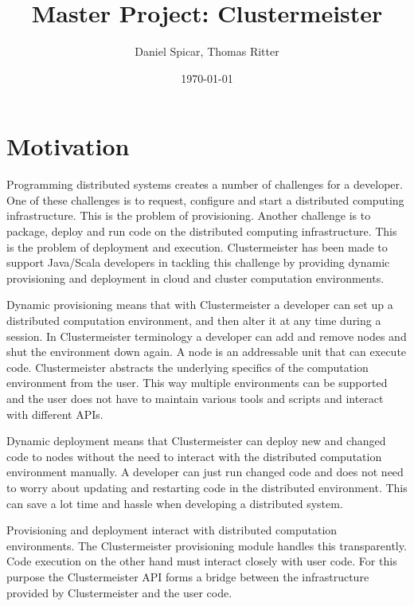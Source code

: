 \documentclass[english]{uzhpub}
\begin{document}
\title{Master Project: Clustermeister}


\author{Daniel Spicar, Thomas Ritter}

\date{\today}

\maketitle


\section{Motivation}

Programming distributed systems creates a number of challenges for a developer. One of these challenges is to request, configure and start a distributed computing infrastructure. This is the problem of provisioning. Another challenge is to package, deploy and run code on the distributed computing infrastructure. This is the problem of deployment and execution. Clustermeister has been made to support Java/Scala developers in tackling this challenge by providing dynamic provisioning and deployment in cloud and cluster computation environments.

Dynamic provisioning means that with Clustermeister a developer can set up a distributed computation environment, and then alter it at any time during a session. In Clustermeister terminology a developer can add and remove nodes and shut the environment down again. A node is an addressable unit that can execute code. Clustermeister abstracts the underlying specifics of the computation environment from the user. This way multiple environments can be supported and the user does not have to maintain various tools and scripts and interact with different APIs.

Dynamic deployment means that Clustermeister can deploy new and changed code to nodes without the need to interact with the distributed computation environment manually. A developer can just run changed code and does not need to worry about updating and restarting code in the distributed environment. This can save a lot time and hassle when developing a distributed system.

Provisioning and deployment interact with distributed computation environments. The Clustermeister provisioning module handles this transparently. Code execution on the other hand must interact closely with user code. For this purpose the Clustermeister API forms a bridge between the infrastructure provided by Clustermeister and the user code.
\end{document}
